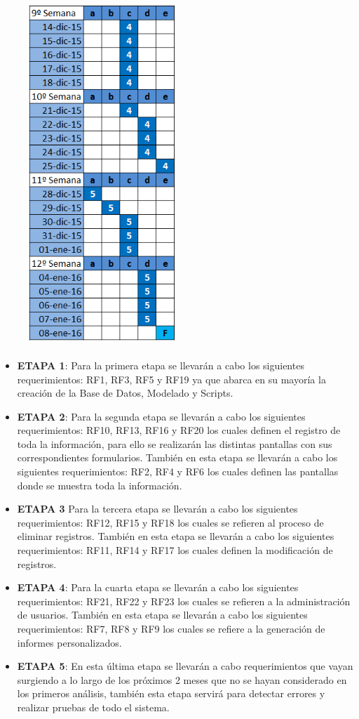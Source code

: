 \begin{figure}[h!]
	\includegraphics[width=5.5cm, height=13cm]{xp4.PNG}
\end{figure}
\begin{itemize}
	\item \textbf{ETAPA 1}: Para la primera etapa se llevarán a cabo los siguientes requerimientos: RF1, RF3, RF5 y RF19 ya que abarca en su mayoría la creación de la Base de Datos, Modelado y Scripts.
	\item \textbf{ETAPA 2}: Para la segunda etapa se llevarán a cabo los siguientes requerimientos: RF10, RF13, RF16 y RF20 los cuales definen el registro de toda la información, para ello se realizarán las distintas pantallas con sus correspondientes formularios.
	También en esta etapa se llevarán a cabo los siguientes requerimientos: RF2, RF4 y RF6  los cuales definen las pantallas donde se muestra toda la información.
	\item \textbf{ETAPA 3} Para la tercera etapa se llevarán a cabo los siguientes requerimientos: RF12, RF15 y RF18 los cuales se refieren al proceso de eliminar registros.
	También en esta etapa se llevarán a cabo los siguientes requerimientos: RF11, RF14 y RF17  los cuales definen la modificación de registros.
	\item \textbf{ETAPA 4}: Para la cuarta etapa se llevarán a cabo los siguientes requerimientos: RF21, RF22 y RF23 los cuales se refieren a la administración de usuarios.
	También en esta etapa se llevarán a cabo los siguientes requerimientos: RF7, RF8 y RF9  los cuales se refiere a la generación de informes personalizados.
	\item \textbf{ETAPA 5}: En esta última etapa se llevarán a cabo requerimientos que vayan surgiendo a lo largo de los próximos 2 meses que no se hayan considerado en los primeros análisis, también esta etapa servirá para detectar errores y realizar pruebas de todo el sistema.
	
\end{itemize}
